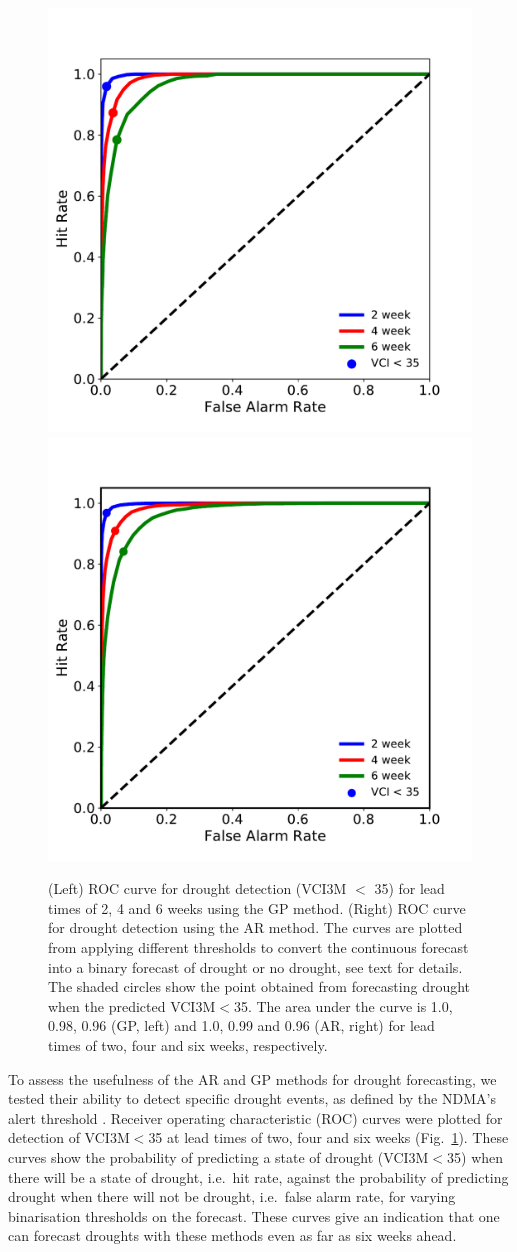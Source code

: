 \documentclass[review]{elsarticle}
\begin{document}
\begin{figure}%
	\centering
	\includegraphics[trim = 20mm 4mm 12mm 3mm,width=5.6 cm]{figures/VCIfcO.pdf}
	\qquad
	\includegraphics[trim = 12mm 4mm 20mm 3mm,width=5.6 cm]{figures/VCIfc0abb2.pdf}
	\caption{(Left) ROC curve for drought detection (VCI3M $<$ 35) for lead times of 2, 4 and 6 weeks using the GP method. (Right) ROC curve for drought detection using the AR method. The curves are plotted from applying different thresholds to convert the continuous forecast into a binary forecast of drought or no drought, see text for details. The shaded circles show the point obtained from forecasting drought when the predicted VCI3M$<$35. The area under the curve is 1.0, 0.98, 0.96 (GP, left) and 1.0, 0.99 and 0.96 (AR, right) for lead times of two, four and six weeks, respectively. }
	\label{fig:ROC_abb}
\end{figure}





To assess the usefulness of the AR and GP methods for drought forecasting, we tested their ability to detect specific drought events, as defined by the NDMA's alert threshold \citep[VCI3M$<$35,][]{rs8040267}. Receiver operating characteristic (ROC) curves were plotted for detection of VCI3M$<$35 at lead times of two, four and six weeks (Fig.~\ref{fig:ROC_abb}). These curves show the probability of predicting a state of drought (VCI3M$<$35) when there will be a state of drought, i.e.~hit rate, against the probability of predicting drought when there will not be drought, i.e.~false alarm rate, for varying binarisation thresholds on the forecast. These curves give an indication that one can forecast droughts with these methods even as far as six weeks ahead. 
\end{document}

